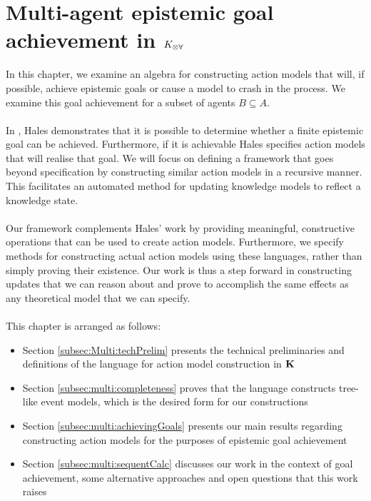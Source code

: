 \chapter{Multi-agent epistemic goal achievement in $K_{\otimes\forall}$} \label{chapter:Multiagent}

In this chapter, we examine an algebra for constructing action models that will, if possible, achieve
epistemic goals or cause a model to crash in the process.
We examine this goal achievement for a subset of agents $B \subseteq A$.\\
\\
In \cite{hales13synthesis}, Hales demonstrates that it is possible to determine whether a
finite epistemic goal can be achieved.
Furthermore, if it is achievable Hales specifies action models that will realise
that goal.
We will focus on defining a framework that goes beyond specification by constructing similar action models in a
recursive manner.
This facilitates an automated method for updating knowledge models to reflect a
knowledge state.\\
\\
Our framework complements Hales' work by providing meaningful, constructive operations
that can be used to create action models.
Furthermore, we specify methods for constructing actual action models using these languages, rather
than simply proving their existence.
Our work is thus a step forward in constructing updates that we can reason about and prove to
accomplish the same effects as any theoretical model that we can specify.\\
\\
This chapter is arranged as follows:

\begin{itemize}
	\item Section \ref{subsec:Multi:techPrelim} presents the technical preliminaries and definitions
		of the language for action model construction in $\bf K$
	\item Section \ref{subsec:multi:completeness} proves that the language constructs tree-like event
		models, which is the desired form for our constructions
	\item Section \ref{subsec:multi:achievingGoals} presents our main results regarding constructing
		action models for the purposes of epistemic goal achievement
	\item Section \ref{subsec:multi:sequentCalc} discusses our work in the context of goal
		achievement, some alternative approaches and open questions that this work raises
\end{itemize}

